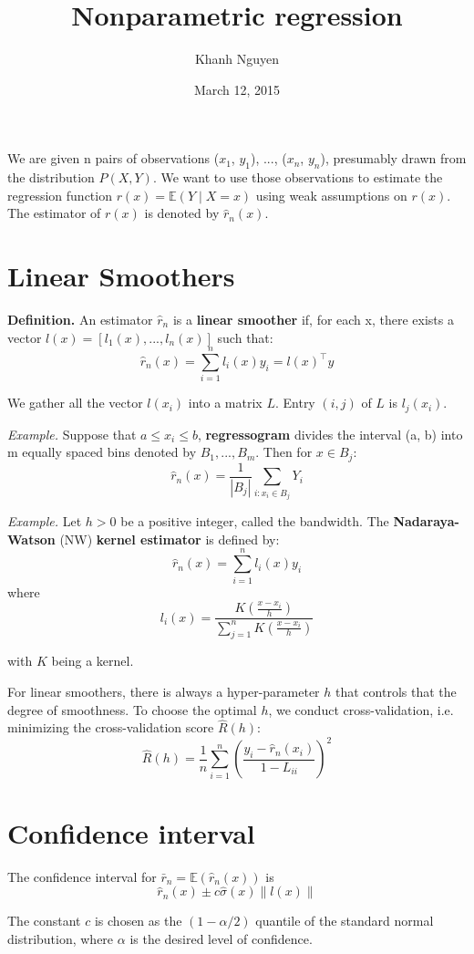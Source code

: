 \documentclass[11pt,letterpaper]{article}
\title{
    Nonparametric regression 
}
\author{
	Khanh Nguyen
}
\date{March 12, 2015}
\newcommand{\norm}[1]{\left\lVert#1\right\rVert}
\theoremstyle{definition}
\begin{document}
\maketitle

We are given n pairs of observations ($x_1$, $y_1$), ..., ($x_n$, $y_n$), presumably drawn from the distribution $P(X, Y)$. We want to use those observations to estimate the regression function $r(x) = \mathbb E(Y \mid X = x)$ using weak assumptions on $r(x)$. The estimator of $r(x)$ is denoted by $\hat{r}_n(x)$.
\section{Linear Smoothers}
\textbf{Definition.} An estimator $\hat{r}_n$ is a \textbf{linear smoother} if, for each x, there exists a vector $l(x) = [l_1(x), ..., l_n(x)]$ such that:
$$\hat{r}_n(x) = \sum_{i = 1}^{n}l_i(x)y_i = l(x)^{\top}y$$

We gather all the vector $l(x_i)$ into a matrix $L$. Entry $(i, j)$ of $L$ is $l_j(x_i)$. 

\textit{Example.} Suppose that $a \leq x_i \leq b$, \textbf{regressogram} divides the interval (a, b) into m equally spaced bins denoted by $B_1, ..., B_m$. Then for $x \in B_j$:
$$\hat{r}_n(x) = \frac{1}{|B_j|} \sum_{i:x_i \in B_j}Y_i$$

\textit{Example.} Let $h > 0$ be a positive integer, called the bandwidth. The \textbf{Nadaraya-Watson} (NW) \textbf{kernel estimator} is defined by:
$$\hat{r}_n(x) = \sum_{i=1}^nl_i(x)y_i$$
where 
$$ l_i(x) = \frac{K(\frac{x - x_i}{h})}{\sum_{j = 1}^nK(\frac{x - x_i}{h})}$$

with $K$ being a kernel. 


For linear smoothers, there is always a hyper-parameter $h$ that controls that the degree of smoothness. To choose the optimal $h$, we conduct cross-validation, i.e. minimizing the cross-validation score $\hat{R}(h)$:
$$\hat{R}(h) = \frac{1}{n}\sum_{i=1}^n\left(\frac{y_i - \hat{r}_n(x_i)}{1 - L_{ii}}\right)^2$$


\section{Confidence interval}

The confidence interval for $\bar{r}_n = \mathbb{E}(\hat{r}_n(x))$ is 
$$\hat{r}_n(x) \pm c\hat{\sigma}(x)\norm{l(x)}$$

The constant $c$ is chosen as the $(1 - \alpha/2)$ quantile of the standard normal distribution, where $\alpha$ is the desired level of confidence.
\end{document}
